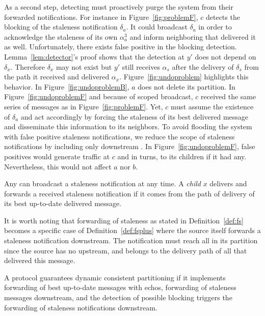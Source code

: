 As a second step, detecting \processes must proactively purge the
system from their forwarded notifications. For instance in
Figure~\ref{fig:problemF}, $c$ detects the blocking of the staleness
notification $\delta_a$. It could broadcast $\delta_a$ in order to
acknowledge the staleness of its own $\alpha_a^3$ and inform
neighboring \processes that delivered it as well. Unfortunately, there
exists false positive in the blocking detection.
Lemma~\ref{lem:detector}'s proof shows that the detection at $y'$ does
not depend on $\delta_x$. Therefore $\delta_x$ may not exist but $y'$
still receives $\alpha_s$ after the delivery of $\delta_s$ from the
path it received and delivered
$\alpha_x$. Figure~\ref{fig:undoproblem} highlights this behavior. In
Figure~\ref{fig:undoproblemB}, $a$ does not delete its partition. In
Figure~\ref{fig:undoproblemF} and because of scoped broadcast, $c$
received the same series of messages as in
Figure~\ref{fig:problemF}. Yet, $c$ must assume the existence of
$\delta_a$ and act accordingly by forcing the staleness of its best
delivered message and disseminate this information to its neighbors.
To avoid flooding the system with false positive staleness
notifications, we reduce the scope of staleness notifications by
including only downstream \processes. In
Figure~\ref{fig:undoproblemF}, false positives would generate traffic
at $c$ and in turns, to its children if it had any. Nevertheless, this
would not affect $a$ nor $b$.

\begin{definition} Any \emph{\process} can broadcast a
  staleness notification at any time. A \emph{child \process} $x$
  delivers and forwards a received staleness notification if it comes
  from the path of delivery of its best up-to-date delivered
  message.
\end{definition}

It is worth noting that forwarding of staleness as stated in
Definition~\ref{def:fs} becomes a specific case of
Definition~\ref{def:fsplus} where the source itself forwards a
staleness notification downstream. The notification must reach all
\processes in its partition since the source has no \processes
upstream, and belongs to the delivery path of all \processes that
delivered this message.

\begin{theorem}
  A protocol guarantees dynamic consistent partitioning if it
  implements forwarding of best up-to-date messages with echos,
  forwarding of staleness messages downstream, and the detection of
  possible blocking triggers the forwarding of staleness notifications
  downstream.
\end{theorem}

